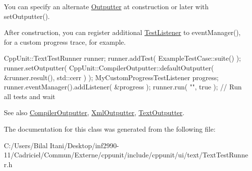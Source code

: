 You can specify an alternate \hyperlink{class_outputter}{Outputter} at construction or later with set\+Outputter().

After construction, you can register additional \hyperlink{class_test_listener}{Test\+Listener} to event\+Manager(), for a custom progress trace, for example.


\begin{DoxyCode}
CppUnit::TextTestRunner runner;
runner.addTest( ExampleTestCase::suite() );
runner.setOutputter( CppUnit::CompilerOutputter::defaultOutputter( 
                         &runner.result(),
                         std::cerr ) );
MyCustomProgressTestListener progress;
runner.eventManager().addListener( &progress );
runner.run( \textcolor{stringliteral}{""}, \textcolor{keyword}{true} );    \textcolor{comment}{// Run all tests and wait}
\end{DoxyCode}


\begin{DoxySeeAlso}{See also}
\hyperlink{class_compiler_outputter}{Compiler\+Outputter}, \hyperlink{class_xml_outputter}{Xml\+Outputter}, \hyperlink{class_text_outputter}{Text\+Outputter}. 
\end{DoxySeeAlso}


The documentation for this class was generated from the following file\+:\begin{DoxyCompactItemize}
\item 
C\+:/\+Users/\+Bilal Itani/\+Desktop/inf2990-\/11/\+Cadriciel/\+Commun/\+Externe/cppunit/include/cppunit/ui/text/Text\+Test\+Runner.\+h\end{DoxyCompactItemize}
